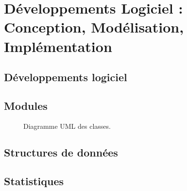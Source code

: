 \chapter{Développements Logiciel : Conception, Modélisation, Implémentation} 

\section{Développements logiciel}

\section{Modules}

\begin{figure}[!htbp]
\center
\caption{Diagramme UML des classes.}
\label{fig:uml_diagram}
\end{figure}
\FloatBarrier


\section{Structures de données}

\section{Statistiques}

\clearpage
